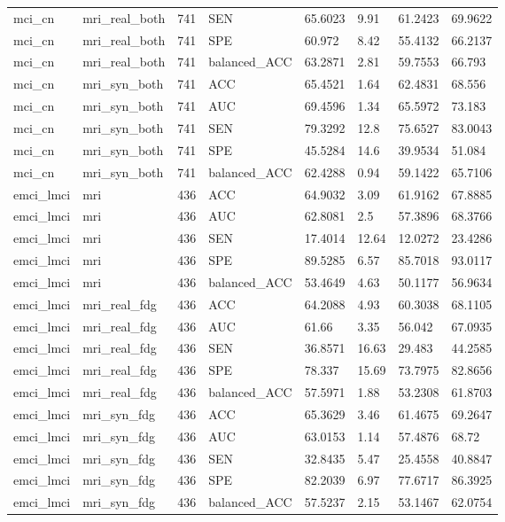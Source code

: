 \begin{landscape}
\begin{longtable}{llllllll}
mci\_cn & mri\_real\_both & 741 & SEN & 65.6023 & 9.91 & 61.2423 & 69.9622 \\
mci\_cn & mri\_real\_both & 741 & SPE & 60.972 & 8.42 & 55.4132 & 66.2137 \\
mci\_cn & mri\_real\_both & 741 & balanced\_ACC & 63.2871 & 2.81 & 59.7553 & 66.793 \\
mci\_cn & mri\_syn\_both & 741 & ACC & 65.4521 & 1.64 & 62.4831 & 68.556 \\
mci\_cn & mri\_syn\_both & 741 & AUC & 69.4596 & 1.34 & 65.5972 & 73.183 \\
mci\_cn & mri\_syn\_both & 741 & SEN & 79.3292 & 12.8 & 75.6527 & 83.0043 \\
mci\_cn & mri\_syn\_both & 741 & SPE & 45.5284 & 14.6 & 39.9534 & 51.084 \\
mci\_cn & mri\_syn\_both & 741 & balanced\_ACC & 62.4288 & 0.94 & 59.1422 & 65.7106 \\
emci\_lmci & mri & 436 & ACC & 64.9032 & 3.09 & 61.9162 & 67.8885 \\
emci\_lmci & mri & 436 & AUC & 62.8081 & 2.5 & 57.3896 & 68.3766 \\
emci\_lmci & mri & 436 & SEN & 17.4014 & 12.64 & 12.0272 & 23.4286 \\
emci\_lmci & mri & 436 & SPE & 89.5285 & 6.57 & 85.7018 & 93.0117 \\
emci\_lmci & mri & 436 & balanced\_ACC & 53.4649 & 4.63 & 50.1177 & 56.9634 \\
emci\_lmci & mri\_real\_fdg & 436 & ACC & 64.2088 & 4.93 & 60.3038 & 68.1105 \\
emci\_lmci & mri\_real\_fdg & 436 & AUC & 61.66 & 3.35 & 56.042 & 67.0935 \\
emci\_lmci & mri\_real\_fdg & 436 & SEN & 36.8571 & 16.63 & 29.483 & 44.2585 \\
emci\_lmci & mri\_real\_fdg & 436 & SPE & 78.337 & 15.69 & 73.7975 & 82.8656 \\
emci\_lmci & mri\_real\_fdg & 436 & balanced\_ACC & 57.5971 & 1.88 & 53.2308 & 61.8703 \\
emci\_lmci & mri\_syn\_fdg & 436 & ACC & 65.3629 & 3.46 & 61.4675 & 69.2647 \\
emci\_lmci & mri\_syn\_fdg & 436 & AUC & 63.0153 & 1.14 & 57.4876 & 68.72 \\
emci\_lmci & mri\_syn\_fdg & 436 & SEN & 32.8435 & 5.47 & 25.4558 & 40.8847 \\
emci\_lmci & mri\_syn\_fdg & 436 & SPE & 82.2039 & 6.97 & 77.6717 & 86.3925 \\
emci\_lmci & mri\_syn\_fdg & 436 & balanced\_ACC & 57.5237 & 2.15 & 53.1467 & 62.0754 \\

\end{longtable}
\end{landscape}
